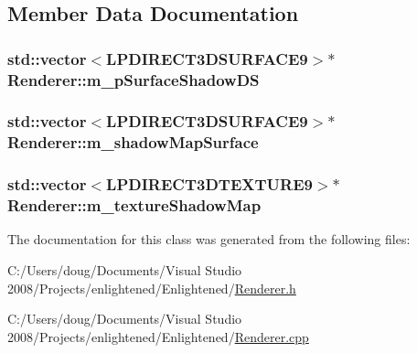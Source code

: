 \subsection{Member Data Documentation}
\hypertarget{class_renderer_ab086d49d8f8083de6a6fb30116808719}{
\subsubsection[{m\_\-pSurfaceShadowDS}]{\setlength{\rightskip}{0pt plus 5cm}std::vector$<$LPDIRECT3DSURFACE9$>$$\ast$ {\bf Renderer::m\_\-pSurfaceShadowDS}}}
\label{class_renderer_ab086d49d8f8083de6a6fb30116808719}
\hypertarget{class_renderer_a43f8f987b555a905a0674246e3f21cec}{
\subsubsection[{m\_\-shadowMapSurface}]{\setlength{\rightskip}{0pt plus 5cm}std::vector$<$LPDIRECT3DSURFACE9$>$$\ast$ {\bf Renderer::m\_\-shadowMapSurface}}}
\label{class_renderer_a43f8f987b555a905a0674246e3f21cec}
\hypertarget{class_renderer_a5a486c35dea90ef50d63e8adbe8c22da}{
\subsubsection[{m\_\-textureShadowMap}]{\setlength{\rightskip}{0pt plus 5cm}std::vector$<$LPDIRECT3DTEXTURE9$>$$\ast$ {\bf Renderer::m\_\-textureShadowMap}}}
\label{class_renderer_a5a486c35dea90ef50d63e8adbe8c22da}


The documentation for this class was generated from the following files:\begin{DoxyCompactItemize}
\item 
C:/Users/doug/Documents/Visual Studio 2008/Projects/enlightened/Enlightened/\hyperlink{_renderer_8h}{Renderer.h}\item 
C:/Users/doug/Documents/Visual Studio 2008/Projects/enlightened/Enlightened/\hyperlink{_renderer_8cpp}{Renderer.cpp}\end{DoxyCompactItemize}
